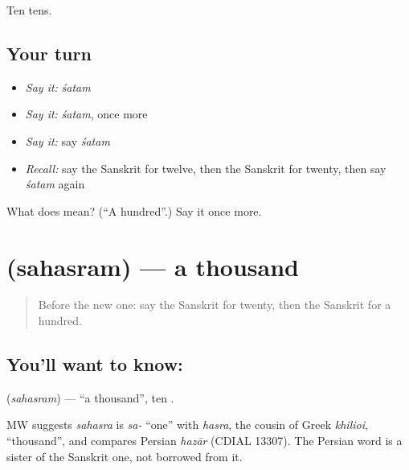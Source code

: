 \begin{grammarlens}[title={What you've built}]
Ten tens.
\end{grammarlens}

\subsection*{Your turn}
\begin{itemize}
\raggedright
  \item \emph{Say it:} \emph{śatam}
  \item \emph{Say it:} \emph{śatam}, once more
  \item \emph{Say it:} say \emph{śatam}
  \item \emph{Recall:} say the Sanskrit for twelve, then the Sanskrit for twenty, then say \emph{śatam} again
\end{itemize}

\begin{tcolorbox}[breakable,colback=teal!4,colframe=teal!35!black,title={Before you move on}]
What does  mean? (\textquotedblleft{}A hundred\textquotedblright{}.) Say it once more.
\end{tcolorbox}
\section[\texorpdfstring{\sk{सहस्रम्} (sahasram)}{सहस्रम् (sahasram)}]{ (sahasram) — a thousand}

\label{lesson:SA-C87-thousand}



\begin{quote}
Before the new one: say the Sanskrit for twenty, then the Sanskrit for a hundred.
\end{quote}

\subsection*{You'll want to know: }
\textbf{} (\emph{sahasram}) — \textquotedblleft{}a thousand\textquotedblright{}, ten \textbf{}.

\begin{cousinweb}
MW suggests \emph{sahasra} is \emph{sa-} \textquotedblleft{}one\textquotedblright{} with \emph{hasra}, the cousin of Greek \emph{khilioi}, \textquotedblleft{}thousand\textquotedblright{}, and compares Persian \emph{hazār} (CDIAL 13307). The Persian word is a sister of the Sanskrit one, not borrowed from it.
\end{cousinweb}

